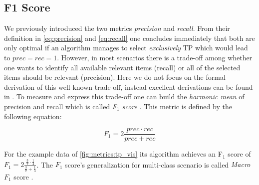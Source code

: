 \subsection{F1 Score}
\label{chp:fundamentals:sec:metrics:subsec:f1_score}

We previously introduced the two metrics \textit{precision} and \textit{recall}.
From their definition in \cref{eq:precision} and \cref{eq:recall} one concludes immediately that both are only optimal if an algorithm manages to select \textit{exclusively} \ac{TP} which would lead to $prec = rec = 1$.
However, in most scenarios there is a trade-off among whether one wants to identify all available relevant items (recall) or all of the selected items should be relevant (precision).
Here we do not focus on the formal derivation of this well known trade-off, instead excellent derivations can be found in \textcites{Gordon:1989}{Zhu:2004}.
To measure and express this trade-off one can build the \textit{harmonic mean} of precision and recall which is called \textit{F$_1$ score} \parencite{Powers:2011}.
This metric is defined by the following equation:

\begin{equation}\label{eq:f1_score}
    F_1 = 2 \frac{prec \cdot rec}{prec+rec}
\end{equation}

For the example data of \cref{fig:metrics:tp_vis} its algorithm achieves an F$_1$ score of $F_1 = 2 \frac{\frac{3}{7} \cdot \frac{1}{4}}{\frac{3}{7}+\frac{1}{4}}$.
The $F_1$ score's generalization for multi-class scenario is called \textit{Macro $F_1$} score \parencite{Opitz:2019}.
